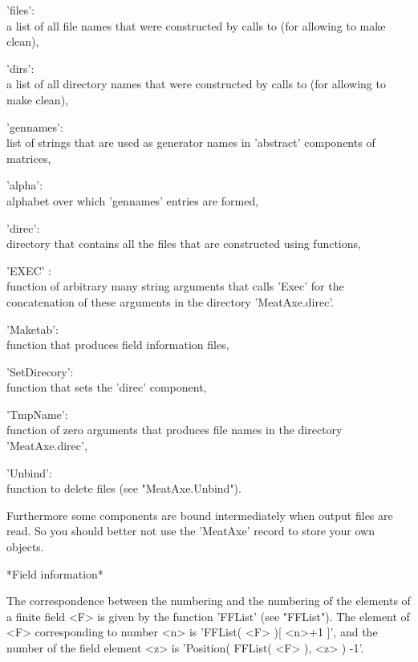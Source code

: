 'files':\\    a list of all file names that were constructed by calls
            to {\MeatAxe} (for allowing to make clean),

'dirs':\\     a list of all directory names that were constructed by calls
            to {\MeatAxe} (for allowing to make clean),

'gennames':\\ list of strings that are used as generator names
            in 'abstract' components of {\MeatAxe} matrices,

'alpha':\\    alphabet over which 'gennames' entries are formed,

'direc':\\ directory that contains all the files that are constructed
           using {\MeatAxe} functions,

'EXEC' : \\
    function of arbitrary many string arguments that calls 'Exec'
    for the concatenation of these arguments in the directory
    'MeatAxe.direc'.

'Maketab':\\ function that produces field information files,

'SetDirecory':\\ function that sets the 'direc' component,

'TmpName':\\ function of zero arguments that produces file names in the
             directory 'MeatAxe.direc',

'Unbind':\\   function to delete files (see "MeatAxe.Unbind").

Furthermore some components are bound intermediately when {\MeatAxe} output
files are read.  So you should better not use the 'MeatAxe' record to store
your own objects.

\vspace{5mm}

*Field information*

The correspondence between the {\MeatAxe} numbering and the {\GAP}
numbering of the elements of a finite field <F> is given by the function
'FFList' (see "FFList").
The element of <F> corresponding to {\MeatAxe} number <n> is
'FFList( <F> )[ <n>+1 ]',
and the {\MeatAxe} number of the field element <z> is
'Position( FFList( <F> ), <z> ) -1'.


